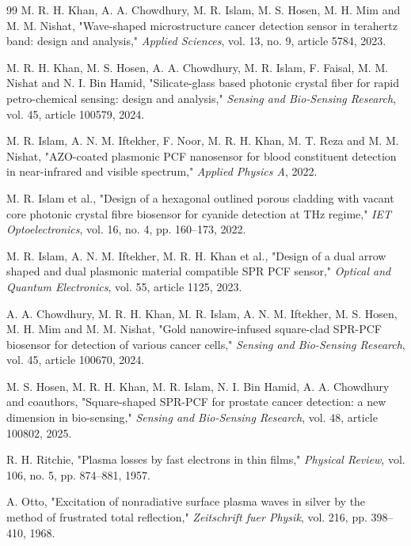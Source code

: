 \documentclass[5p,times,twocolumn]{elsarticle}
\begin{document}
\begin{thebibliography}{99}
 M. R. H. Khan, A. A. Chowdhury, M. R. Islam, M. S. Hosen, M. H. Mim and M. M. Nishat, "Wave-shaped microstructure cancer detection sensor in terahertz band: design and analysis," \textit{Applied Sciences}, vol. 13, no. 9, article 5784, 2023.

 M. R. H. Khan, M. S. Hosen, A. A. Chowdhury, M. R. Islam, F. Faisal, M. M. Nishat and N. I. Bin Hamid, "Silicate-glass based photonic crystal fiber for rapid petro-chemical sensing: design and analysis," \textit{Sensing and Bio-Sensing Research}, vol. 45, article 100579, 2024.

 M. R. Islam, A. N. M. Iftekher, F. Noor, M. R. H. Khan, M. T. Reza and M. M. Nishat, "AZO-coated plasmonic PCF nanosensor for blood constituent detection in near-infrared and visible spectrum," \textit{Applied Physics A}, 2022.

 M. R. Islam et al., "Design of a hexagonal outlined porous cladding with vacant core photonic crystal fibre biosensor for cyanide detection at THz regime," \textit{IET Optoelectronics}, vol. 16, no. 4, pp. 160--173, 2022.

 M. R. Islam, A. N. M. Iftekher, M. R. H. Khan et al., "Design of a dual arrow shaped and dual plasmonic material compatible SPR PCF sensor," \textit{Optical and Quantum Electronics}, vol. 55, article 1125, 2023.

 A. A. Chowdhury, M. R. H. Khan, M. R. Islam, A. N. M. Iftekher, M. S. Hosen, M. H. Mim and M. M. Nishat, "Gold nanowire-infused square-clad SPR-PCF biosensor for detection of various cancer cells," \textit{Sensing and Bio-Sensing Research}, vol. 45, article 100670, 2024.

 M. S. Hosen, M. R. H. Khan, M. R. Islam, N. I. Bin Hamid, A. A. Chowdhury and coauthors, "Square-shaped SPR-PCF for prostate cancer detection: a new dimension in bio-sensing," \textit{Sensing and Bio-Sensing Research}, vol. 48, article 100802, 2025.

 R. H. Ritchie, "Plasma losses by fast electrons in thin films," \textit{Physical Review}, vol. 106, no. 5, pp. 874--881, 1957.

 A. Otto, "Excitation of nonradiative surface plasma waves in silver by the method of frustrated total reflection," \textit{Zeitschrift fuer Physik}, vol. 216, pp. 398--410, 1968.


\end{thebibliography}
\end{document}
